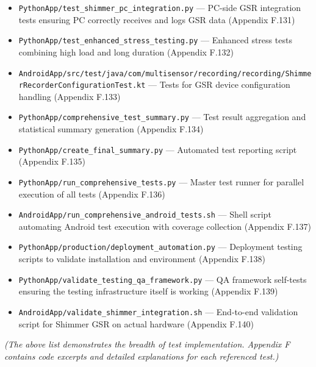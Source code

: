 {{\begin{itemize}
\item \texttt{PythonApp/test_shimmer_pc_integration.py} --- PC-side GSR integration
  tests ensuring PC correctly receives and logs GSR data (Appendix
  F.131)
\item \texttt{PythonApp/test_enhanced_stress_testing.py} --- Enhanced stress tests
  combining high load and long duration (Appendix F.132)
\item \texttt{AndroidApp/src/test/java/com/multisensor/recording/recording/ShimmerRecorderConfigurationTest.kt}
  --- Tests for GSR device configuration handling (Appendix F.133)
\item \texttt{PythonApp/comprehensive_test_summary.py} --- Test result aggregation
  and statistical summary generation (Appendix F.134)
\item \texttt{PythonApp/create_final_summary.py} --- Automated test reporting script
  (Appendix F.135)
\item \texttt{PythonApp/run_comprehensive_tests.py} --- Master test runner for
  parallel execution of all tests (Appendix F.136)
\item \texttt{AndroidApp/run_comprehensive_android_tests.sh} --- Shell script
  automating Android test execution with coverage collection (Appendix
  F.137)
\item \texttt{PythonApp/production/deployment_automation.py} --- Deployment testing
  scripts to validate installation and environment (Appendix F.138)
\item \texttt{PythonApp/validate_testing_qa_framework.py} --- QA framework
  self-tests ensuring the testing infrastructure itself is working
  (Appendix F.139)
\item \texttt{AndroidApp/validate_shimmer_integration.sh} --- End-to-end validation
  script for Shimmer GSR on actual hardware (Appendix F.140)

\end{itemize}
\textit{(The above list demonstrates the breadth of test implementation.
Appendix F contains code excerpts and detailed explanations for each
referenced test.)}

}}
